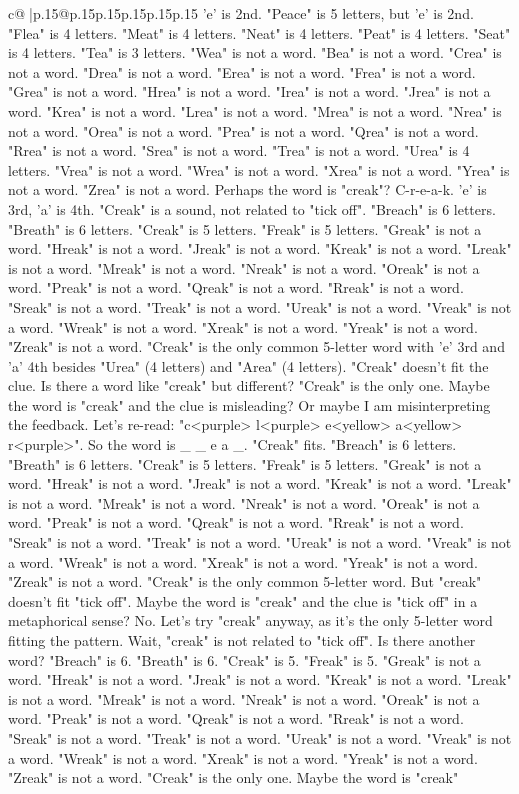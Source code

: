 \documentclass{article}
\begin{document}
{\begin{supertabular}{c@{$\;$}|p{.15\linewidth}@{}p{.15\linewidth}p{.15\linewidth}p{.15\linewidth}p{.15\linewidth}p{.15\linewidth}}
{{{'e' is 2nd. "Peace" is 5 letters, but 'e' is 2nd. "Flea" is 4 letters. "Meat" is 4 letters. "Neat" is 4 letters. "Peat" is 4 letters. "Seat" is 4 letters. "Tea" is 3 letters. "Wea" is not a word. "Bea" is not a word. "Crea" is not a word. "Drea" is not a word. "Erea" is not a word. "Frea" is not a word. "Grea" is not a word. "Hrea" is not a word. "Irea" is not a word. "Jrea" is not a word. "Krea" is not a word. "Lrea" is not a word. "Mrea" is not a word. "Nrea" is not a word. "Orea" is not a word. "Prea" is not a word. "Qrea" is not a word. "Rrea" is not a word. "Srea" is not a word. "Trea" is not a word. "Urea" is 4 letters. "Vrea" is not a word. "Wrea" is not a word. "Xrea" is not a word. "Yrea" is not a word. "Zrea" is not a word. Perhaps the word is "creak"? C{-}r{-}e{-}a{-}k. 'e' is 3rd, 'a' is 4th. "Creak" is a sound, not related to "tick off". "Breach" is 6 letters. "Breath" is 6 letters. "Creak" is 5 letters. "Freak" is 5 letters. "Greak" is not a word. "Hreak" is not a word. "Jreak" is not a word. "Kreak" is not a word. "Lreak" is not a word. "Mreak" is not a word. "Nreak" is not a word. "Oreak" is not a word. "Preak" is not a word. "Qreak" is not a word. "Rreak" is not a word. "Sreak" is not a word. "Treak" is not a word. "Ureak" is not a word. "Vreak" is not a word. "Wreak" is not a word. "Xreak" is not a word. "Yreak" is not a word. "Zreak" is not a word. "Creak" is the only common 5{-}letter word with 'e' 3rd and 'a' 4th besides "Urea" (4 letters) and "Area" (4 letters). "Creak" doesn't fit the clue. Is there a word like "creak" but different? "Creak" is the only one. Maybe the word is "creak" and the clue is misleading? Or maybe I am misinterpreting the feedback. Let's re{-}read: "c<purple> l<purple> e<yellow> a<yellow> r<purple>". So the word is \_ \_ e a \_. "Creak" fits. "Breach" is 6 letters. "Breath" is 6 letters. "Creak" is 5 letters. "Freak" is 5 letters. "Greak" is not a word. "Hreak" is not a word. "Jreak" is not a word. "Kreak" is not a word. "Lreak" is not a word. "Mreak" is not a word. "Nreak" is not a word. "Oreak" is not a word. "Preak" is not a word. "Qreak" is not a word. "Rreak" is not a word. "Sreak" is not a word. "Treak" is not a word. "Ureak" is not a word. "Vreak" is not a word. "Wreak" is not a word. "Xreak" is not a word. "Yreak" is not a word. "Zreak" is not a word. "Creak" is the only common 5{-}letter word. But "creak" doesn't fit "tick off". Maybe the word is "creak" and the clue is "tick off" in a metaphorical sense? No. Let's try "creak" anyway, as it's the only 5{-}letter word fitting the pattern. Wait, "creak" is not related to "tick off". Is there another word? "Breach" is 6. "Breath" is 6. "Creak" is 5. "Freak" is 5. "Greak" is not a word. "Hreak" is not a word. "Jreak" is not a word. "Kreak" is not a word. "Lreak" is not a word. "Mreak" is not a word. "Nreak" is not a word. "Oreak" is not a word. "Preak" is not a word. "Qreak" is not a word. "Rreak" is not a word. "Sreak" is not a word. "Treak" is not a word. "Ureak" is not a word. "Vreak" is not a word. "Wreak" is not a word. "Xreak" is not a word. "Yreak" is not a word. "Zreak" is not a word. "Creak" is the only one. Maybe the word is "creak" }}}
\end{supertabular}}
\end{document}
